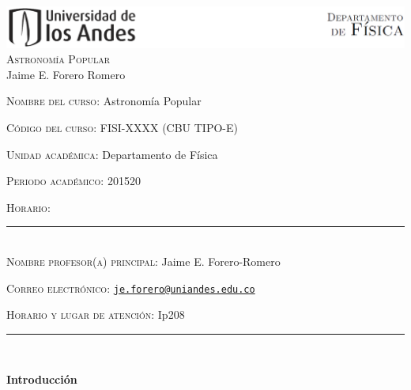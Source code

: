 \documentclass[letterpaper,10pt,onecolumn]{article}
\begin{document}
\begin{center}

\includegraphics[width=490pt]{header.png}\\[0.5cm]

\textsc{\LARGE Astronom\'ia Popular}\\[0.1cm]

\large Jaime E. Forero Romero\\[0.5cm]

\end{center}

\large \noindent\textsc{Nombre del curso:} Astronom\'ia Popular %
 
\noindent\textsc{C\'odigo del curso:} FISI-XXXX (CBU TIPO-E)%

\noindent\textsc{Unidad acad\'emica:} Departamento de F\'isica

\noindent\textsc{Periodo acad\'emico:} 201520 %

\noindent\textsc{Horario:} %

\noindent\rule{\textwidth}{1pt}\\[-0.3cm]

\normalsize \noindent\textsc{Nombre profesor(a) principal:} Jaime E. Forero-Romero %

\noindent\textsc{Correo electr\'onico:} \href{mailto:je.forero@uniandes.edu.co}{\nolinkurl{je.forero@uniandes.edu.co}} %

\noindent\textsc{Horario y lugar de atenci\'on:} Ip208 %
\\[-0.1cm]


\noindent\rule{\textwidth}{1pt}\\[-0.1cm]

\addtocounter{mysection}{1}

\noindent\textbf{\large {} \quad Introducci\'on}\\[-0.2cm]

\end{document}
